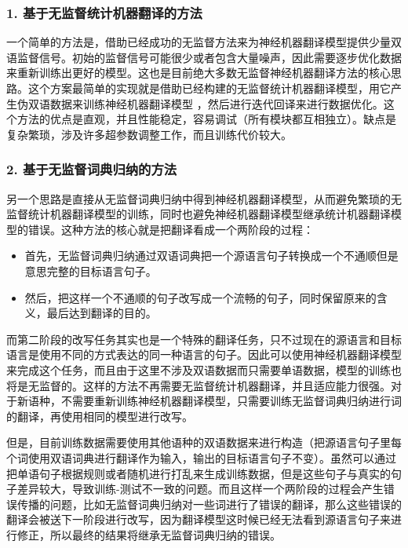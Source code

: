 \subsubsection{1. 基于无监督统计机器翻译的方法}

\parinterval 一个简单的方法是，借助已经成功的无监督方法来为神经机器翻译模型提供少量双语监督信号。初始的监督信号可能很少或者包含大量噪声，因此需要逐步优化数据来重新训练出更好的模型。这也是目前绝大多数无监督神经机器翻译方法的核心思路。这个方案最简单的实现就是借助已经构建的无监督统计机器翻译模型，用它产生伪双语数据来训练神经机器翻译模型 ，然后进行迭代回译来进行数据优化。这个方法的优点是直观，并且性能稳定，容易调试（所有模块都互相独立）。缺点是复杂繁琐，涉及许多超参数调整工作，而且训练代价较大。

\subsubsection{2. 基于无监督词典归纳的方法}

\parinterval 另一个思路是直接从无监督词典归纳中得到神经机器翻译模型，从而避免繁琐的无监督统计机器翻译模型的训练，同时也避免神经机器翻译模型继承统计机器翻译模型的错误。这种方法的核心就是把翻译看成一个两阶段的过程：

\begin{itemize}
\vspace{0.5em}
\item 首先，无监督词典归纳通过双语词典把一个源语言句子转换成一个不通顺但是意思完整的目标语言句子。
\vspace{0.5em}
\item 然后，把这样一个不通顺的句子改写成一个流畅的句子，同时保留原来的含义，最后达到翻译的目的。
\vspace{0.5em}
\end{itemize}

\parinterval 而第二阶段的改写任务其实也是一个特殊的翻译任务，只不过现在的源语言和目标语言是使用不同的方式表达的同一种语言的句子。因此可以使用神经机器翻译模型来完成这个任务，而且由于这里不涉及双语数据而只需要单语数据，模型的训练也将是无监督的。这样的方法不再需要无监督统计机器翻译，并且适应能力很强。对于新语种，不需要重新训练神经机器翻译模型，只需要训练无监督词典归纳进行词的翻译，再使用相同的模型进行改写。

\parinterval 但是，目前训练数据需要使用其他语种的双语数据来进行构造（把源语言句子里每个词使用双语词典进行翻译作为输入，输出的目标语言句子不变）。虽然可以通过把单语句子根据规则或者随机进行打乱来生成训练数据，但是这些句子与真实的句子差异较大，导致训练-测试不一致的问题。而且这样一个两阶段的过程会产生错误传播的问题，比如无监督词典归纳对一些词进行了错误的翻译，那么这些错误的翻译会被送下一阶段进行改写，因为翻译模型这时候已经无法看到源语言句子来进行修正，所以最终的结果将继承无监督词典归纳的错误。

